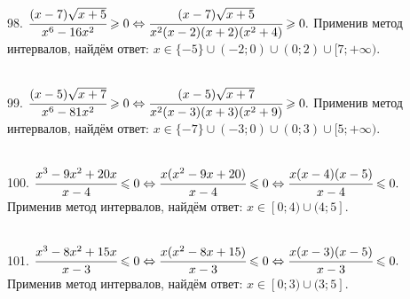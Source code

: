 98. $\cfrac{(x-7)\sqrt{x+5}}{x^6-16x^2}\geqslant0\Leftrightarrow
\cfrac{(x-7)\sqrt{x+5}}{x^2(x-2)(x+2)(x^2+4)}\geqslant0.$ Применив метод интервалов, найдём ответ: $x\in\{-5\}\cup(-2;0)\cup(0;2)\cup[7;+\infty).$
\begin{figure}[ht!]
\end{figure}\\
99. $\cfrac{(x-5)\sqrt{x+7}}{x^6-81x^2}\geqslant0\Leftrightarrow
\cfrac{(x-5)\sqrt{x+7}}{x^2(x-3)(x+3)(x^2+9)}\geqslant0.$ Применив метод интервалов, найдём ответ: $x\in\{-7\}\cup(-3;0)\cup(0;3)\cup[5;+\infty).$
\begin{figure}[ht!]
\end{figure}\\
100. $\cfrac{x^3-9x^2+20x}{x-4}\leqslant0\Leftrightarrow \cfrac{x(x^2-9x+20)}{x-4}\leqslant0\Leftrightarrow\cfrac{x(x-4)(x-5)}{x-4}\leqslant0.$ Применив метод интервалов, найдём ответ: $x\in[0;4)\cup(4;5].$
\begin{figure}[ht!]
\end{figure}\\
101. $\cfrac{x^3-8x^2+15x}{x-3}\leqslant0\Leftrightarrow \cfrac{x(x^2-8x+15)}{x-3}\leqslant0\Leftrightarrow\cfrac{x(x-3)(x-5)}{x-3}\leqslant0.$ Применив метод интервалов, найдём ответ: $x\in[0;3)\cup(3;5].$
\begin{figure}[ht!]
\end{figure}
\newpage
